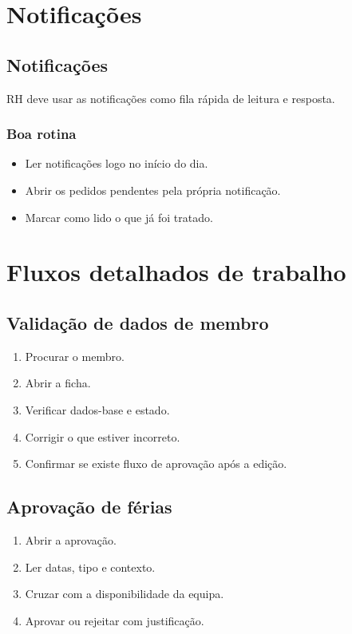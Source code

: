 \chapter{Notificações}
\section{Notificações}
RH deve usar as notificações como fila rápida de leitura e resposta.

\subsection{Boa rotina}
\begin{itemize}
  \item Ler notificações logo no início do dia.
  \item Abrir os pedidos pendentes pela própria notificação.
  \item Marcar como lido o que já foi tratado.
\end{itemize}

\chapter{Fluxos detalhados de trabalho}
\section{Validação de dados de membro}
\begin{enumerate}
  \item Procurar o membro.
  \item Abrir a ficha.
  \item Verificar dados-base e estado.
  \item Corrigir o que estiver incorreto.
  \item Confirmar se existe fluxo de aprovação após a edição.
\end{enumerate}

\section{Aprovação de férias}
\begin{enumerate}
  \item Abrir a aprovação.
  \item Ler datas, tipo e contexto.
  \item Cruzar com a disponibilidade da equipa.
  \item Aprovar ou rejeitar com justificação.
\end{enumerate}

